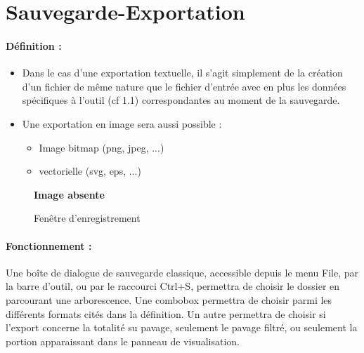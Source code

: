\documentclass[a4paper]{article}
\begin{document}
\section{Sauvegarde-Exportation}

\paragraph{Définition :}
\begin{itemize}
\item
  Dans le cas d'une exportation textuelle, il s'agit simplement de la création d'un fichier de même nature que le fichier d'entrée avec en plus les données spécifiques à l'outil (cf  1.1) correspondantes au moment de la sauvegarde.
\item
  Une exportation en image sera aussi possible :
  \begin{itemize}
  \item
    Image bitmap (png, jpeg, ...)
  \item
    vectorielle (svg, eps, ...)
  \end{itemize}
\end{itemize}
\begin{figure}[h] %
  \center
  \bf \Huge Image absente
  \caption{Fenêtre d'enregistrement } %
\end{figure} %

\paragraph{Fonctionnement :}
Une boîte de dialogue de sauvegarde classique, accessible depuis le menu File, par la barre d'outil, ou par le raccourci Ctrl+S, permettra de choisir le dossier en parcourant une arborescence. Une combobox permettra de choisir parmi les différents formats cités dans la définition. Un autre permettra de choisir si l'export concerne la totalité su pavage, seulement le pavage filtré, ou seulement la portion apparaissant dans le panneau de visualisation.

\end{document}
